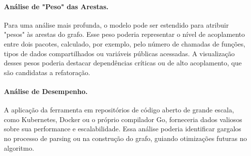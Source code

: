 \documentclass[12pt]{article}
\begin{document}
\paragraph{Análise de "Peso" das Arestas.} Para uma análise mais profunda, o modelo pode ser estendido para atribuir "pesos" às arestas do grafo. Esse peso poderia representar o nível de acoplamento entre dois pacotes, calculado, por exemplo, pelo número de chamadas de funções, tipos de dados compartilhados ou variáveis públicas acessadas. A visualização desses pesos poderia destacar dependências críticas ou de alto acoplamento, que são candidatas a refatoração.

\paragraph{Análise de Desempenho.} A aplicação da ferramenta em repositórios de código aberto de grande escala, como Kubernetes, Docker ou o próprio compilador Go, forneceria dados valiosos sobre sua performance e escalabilidade. Essa análise poderia identificar gargalos no processo de parsing ou na construção do grafo, guiando otimizações futuras no algoritmo.



\end{document}
